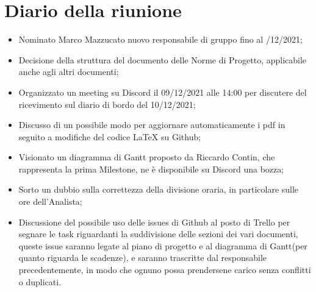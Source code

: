 \section{Diario della riunione}
\begin{itemize}
  \item Nominato Marco Mazzucato nuovo responsabile di gruppo fino al 
    /12/2021;
  \item Decisione della struttura del documento delle Norme di Progetto, applicabile anche agli altri documenti;
  \item Organizzato un meeting su Discord il 09/12/2021 alle 14:00 per discutere del ricevimento sul diario di bordo del 10/12/2021;
  \item Discusso di un possibile modo per aggiornare automaticamente i pdf in seguito a modifiche del codice LaTeX su Github;
  \item Visionato un diagramma di Gantt proposto da Riccardo Contin, che rappresenta la prima Milestone, ne è disponibile su Discord una bozza;
  \item Sorto un dubbio sulla correttezza della divisione oraria, in particolare sulle ore dell'Analista;
  \item Discussione del possibile uso delle issues di Github al posto di Trello per segnare
    le task riguardanti la suddivisione delle sezioni dei vari documenti, queste issue saranno legate
    al piano di progetto e al diagramma di Gantt(per quanto riguarda le scadenze), e saranno
    trascritte dal responsabile precedentemente, in modo che ognuno possa prendersene carico senza conflitti o duplicati.
\end{itemize}
